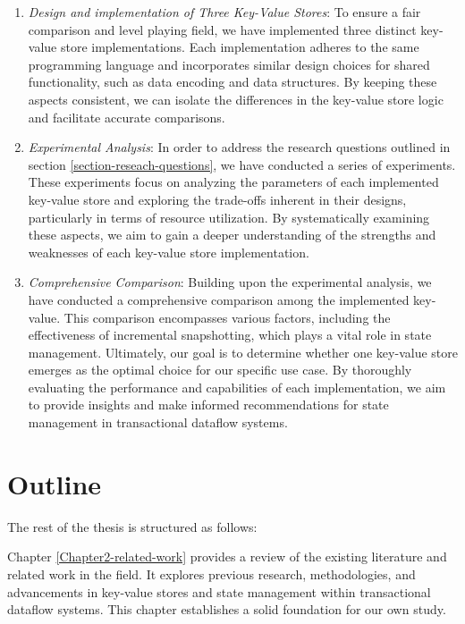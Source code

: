 \begin{enumerate}
    \item \textit{Design and implementation of Three Key-Value Stores}: To ensure a fair comparison and level playing field, we have implemented three distinct key-value store implementations. Each implementation adheres to the same programming language and incorporates similar design choices for shared functionality, such as data encoding and data structures. By keeping these aspects consistent, we can isolate the differences in the key-value store logic and facilitate accurate comparisons.
    
    \item \textit{Experimental Analysis}: In order to address the research questions outlined in section \ref{section-reseach-questions}, we have conducted a series of experiments. These experiments focus on analyzing the parameters of each implemented key-value store and exploring the trade-offs inherent in their designs, particularly in terms of resource utilization. By systematically examining these aspects, we aim to gain a deeper understanding of the strengths and weaknesses of each key-value store implementation.

    \item \textit{Comprehensive Comparison}: Building upon the experimental analysis, we have conducted a comprehensive comparison among the implemented key-value. This comparison encompasses various factors, including the effectiveness of incremental snapshotting, which plays a vital role in state management. Ultimately, our goal is to determine whether one key-value store emerges as the optimal choice for our specific use case. By thoroughly evaluating the performance and capabilities of each implementation, we aim to provide insights and make informed recommendations for state management in transactional dataflow systems.
\end{enumerate}

\section{Outline}

The rest of the thesis is structured as follows:

Chapter \ref{Chapter2-related-work} provides a review of the existing literature and related work in the field. It explores previous research, methodologies, and advancements in key-value stores and state management within transactional dataflow systems. This chapter establishes a solid foundation for our own study.

